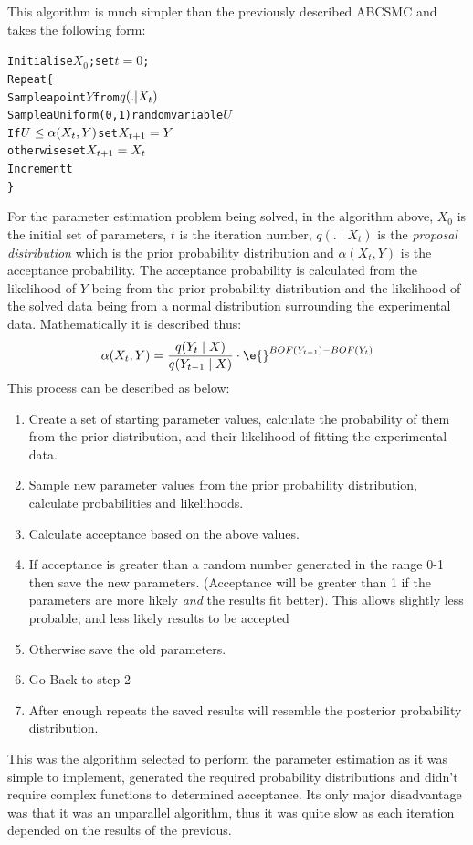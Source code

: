This algorithm is much simpler than the previously described ABCSMC and takes the following form\cite{Gilks1996}:

\singlespacing %
\begin{alltt}
Initialise \(X_0\); set \(t=0\);
Repeat \{
  Sample a point \(Y\) from \(q(.|X\sb{t})\)
  Sample a Uniform(0,1) random variable \(U\)
  If \(U \leq \alpha(X\sb{t},Y)\) set \(X\sb{t+1}=Y\)
    otherwise set \(X\sb{t+1}=X_t\)
  Increment t
\}
\end{alltt}
\doublespacing %

For the parameter estimation problem being solved, in the algorithm above, $X_0$ is the initial set of parameters, $t$ is the iteration number, $q(.\mid X_t)$ is the \textit{proposal distribution} which is the prior probability distribution and $\alpha(X_t,Y)$ is the acceptance probability. The acceptance probability is calculated from the likelihood of $Y$ being from the prior probability distribution and the likelihood of the solved data being from a normal distribution surrounding the experimental data. Mathematically it is described thus:
\begin{equation*}
\alpha(X_t,Y) = \frac{q(Y_t\mid X)}{q(Y_{t-1}\mid X)}\cdot\e{}^{BOF(Y_{t-1}) - BOF(Y_t)}
\end{equation*}
This process can be described as below:
\begin{enumerate}
\item Create a set of starting parameter values, calculate the probability of them from the prior distribution, and their likelihood of fitting the experimental data.
\item Sample new parameter values from the prior probability distribution, calculate probabilities and likelihoods.
\item Calculate acceptance based on the above values.
\item If acceptance is greater than a random number generated in the range 0-1 then save the new parameters. (Acceptance will be greater than 1 if the parameters are more likely \textit{and} the results fit better). This allows slightly less probable, and less likely results to be accepted
\item Otherwise save the old parameters.
\item Go Back to step 2
\item After enough repeats the saved results will resemble the posterior probability distribution.
\end{enumerate}
This was the algorithm selected to perform the parameter estimation as it was simple to implement, generated the required probability distributions and didn't require complex functions to determined acceptance. Its only major disadvantage was that it was an unparallel algorithm, thus it was quite slow as each iteration depended on the results of the previous.

